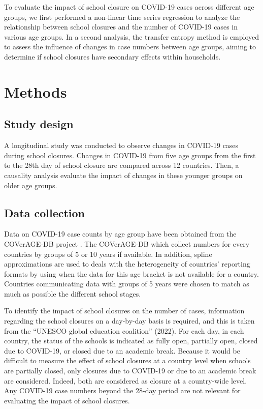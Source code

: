 \documentclass[]{interact}
\theoremstyle{plain}%
\theoremstyle{definition}
\theoremstyle{remark}
\begin{document}
To evaluate the impact of school closure on COVID-19 cases across different age groups, we first performed a non-linear time series regression to analyze the relationship between school closures and the number of COVID-19 cases in various age groups. In a second analysis, the transfer entropy method is employed to assess the influence of changes in case numbers between age groups, aiming to determine if school closures have secondary effects within households.

\section{Methods}\label{methods}

\subsection{Study design}\label{study-design}

A longitudinal study was conducted to observe changes in COVID-19 cases during school closures. Changes in COVID-19 from five age groups from the first to the 28th day of school closure are compared across 12 countries. Then, a causality analysis evaluate the impact of changes in these younger groups on older age groups.

\subsection{Data collection}\label{data-collection}

Data on COVID-19 case counts by age group have been obtained from the COVerAGE-DB project \citep{riffe2021data}. The COVerAGE-DB which collect numbers for every countries by groups of 5 or 10 years if available. In addition, spline approximations are used to deals with the heterogeneity of countries' reporting formats by using when the data for this age bracket is not available for a country. Countries communicating data with groups of 5 years were chosen to match as much as possible the different school stages.

To identify the impact of school closures on the number of cases, information regarding the school closures on a day-by-day basis is required, and this is taken from the ``UNESCO global education coalition'' (2022). For each day, in each country, the status of the schools is indicated as fully open, partially open, closed due to COVID-19, or closed due to an academic break. Because it would be difficult to measure the effect of school closures at a country level when schools are partially closed, only closures due to COVID-19 or due to an academic break are considered. Indeed, both are considered as closure at a country-wide level. Any COVID-19 case numbers beyond the 28-day period are not relevant for evaluating the impact of school closures.
\end{document}
